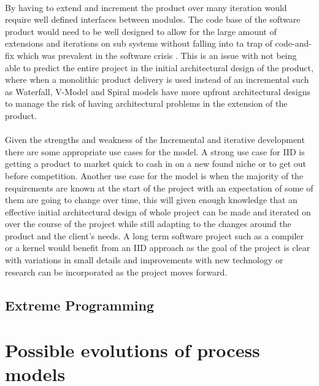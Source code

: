 \documentclass{style/CRPITStyle}
\renewcommand{\cite}{\citep}
\begin{document}
\paragraph{}
By having to extend and increment the product over many iteration would require
well defined interfaces between modules.
The code base of the software product would need to be well designed to 
allow for the large amount of extensions and iterations on sub systems without
falling into ta trap of code-and-fix which was prevalent in the software crisis
\cite{nato:1969}. This is an issue with not being able to predict the entire
project in the initial architectural design of the product, where when a monolithic
product delivery is used instead of an incremental such as Waterfall, V-Model and Spiral models 
have more upfront architectural designs to manage the risk of having
architectural problems in the extension of the product.

\paragraph{}
Given the strengths and weakness of the Incremental and iterative development
there are some appropriate use cases for the model. A strong use case for IID is
getting a product to market quick to cash in on a new found niche or to get out
before competition. Another use case for the model is when the majority of the
requirements are known at the start of the project with an expectation of some
of them are going to change over time, this will given enough knowledge 
that an effective initial architectural design of whole project can be made and
iterated on over the course of the project while still adapting to the changes
around the product and the client's needs. A long term software project such as
a compiler or a kernel would benefit from an IID approach as the goal of the
project is clear with variations in small details and improvements with new
technology or research can be incorporated as the project moves forward.

\subsection{Extreme Programming} %

\section{Possible evolutions of process models}




\end{document}

